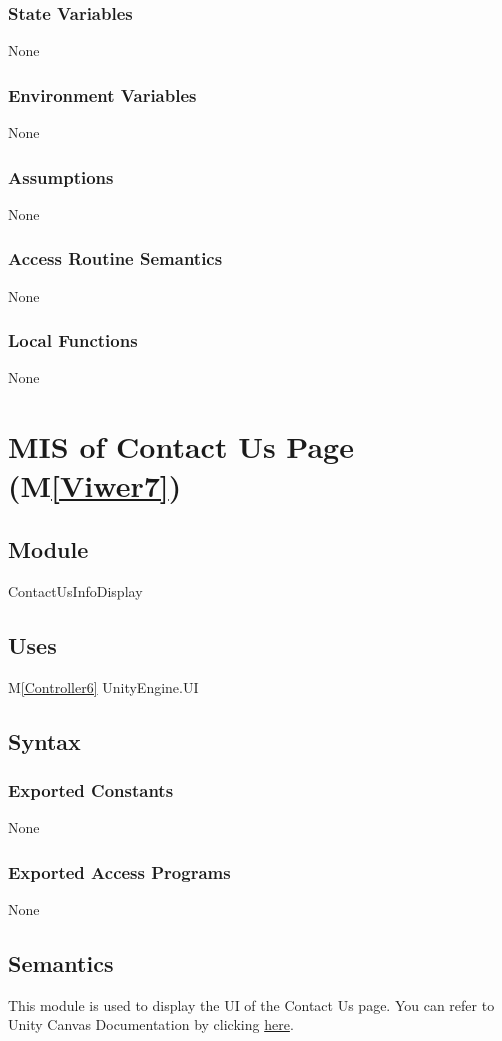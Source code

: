 \documentclass[12pt, titlepage]{article}
\newcommand{\mref}[1]{M\ref{#1}}
\begin{document}
\subsubsection{State Variables}
None
\subsubsection{Environment Variables}
None
\subsubsection{Assumptions}
None
\subsubsection{Access Routine Semantics}
None
\subsubsection{Local Functions}
None

\newpage

\section{MIS of Contact Us Page (\mref{Viwer7})}

\subsection{Module}
ContactUsInfoDisplay

\subsection{Uses}
\mref{Controller6} 
UnityEngine.UI

\subsection{Syntax}
\subsubsection{Exported Constants}
None
\subsubsection{Exported Access Programs}
None

\subsection{Semantics}
This module is used to display the UI of the Contact Us page.
You can refer to Unity Canvas Documentation by clicking 
\href{https://docs.unity3d.com/Packages/com.unity.ugui@1.0/manual/class-Canvas.html}{here}.
\end{document}
